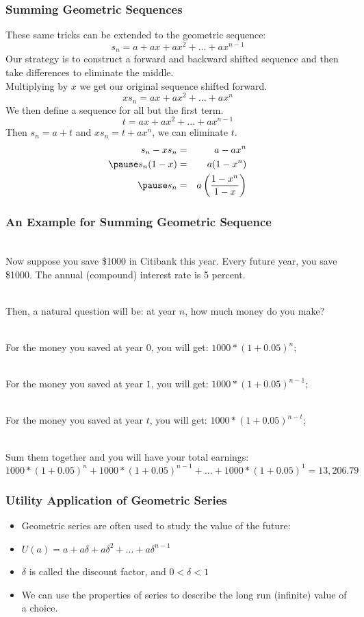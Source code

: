 \documentclass[handout]{beamer}
\numberwithin{equation}{section}
\begin{document}
\begin{frame}
\frametitle{Summing Geometric Sequences}
These same tricks can be extended to the geometric sequence:
$$s_n=a+ax+ax^2+...+ax^{n-1}$$ \pause
Our strategy is to construct a forward and backward shifted sequence and then take differences to eliminate the middle.\pause
\ \\Multiplying by $x$ we get our original sequence shifted forward.
$$xs_n=ax+ax^2+...+ax^n$$ \pause
We then define a sequence for all but the first term.
$$t=ax+ax^2+...+ax^{n-1}$$ \pause 
Then $s_n=a+t$ and $xs_n=t+ax^n$, we can eliminate $t$.  
\begin{eqnarray}
s_n-xs_n&=&a-ax^n \nonumber\\ \pause
s_n(1-x)&=&a(1-x^n) \nonumber\\ \pause
s_n &=& a\left({\frac{1-x^n}{1-x}}\right)  \nonumber
\end{eqnarray}

\end{frame}



\begin{frame}
\frametitle{An Example for Summing Geometric Sequence}

\ \\Now suppose you save \$1000 in Citibank this year. Every future year, you save \$1000. The annual (compound) interest rate is 5 percent. \pause

\ \\Then, a natural question will be: at year $n$, how much money do you make? \pause

\ \\For the money you saved at year $0$, you will get: $1000 * (1 + 0.05)^{n}$; \pause

\ \\For the money you saved at year $1$, you will get: $1000 * (1 + 0.05)^{n-1}$; \pause

\ \\For the money you saved at year $t$, you will get: $1000 * (1 + 0.05)^{n-t}$; \pause

\ \\Sum them together and you will have your total earnings: 
$$1000 * (1 + 0.05)^{n} + 1000 * (1 + 0.05)^{n-1} + ... + 1000 * (1 + 0.05)^{1}=13,206.79$$

\end{frame}

\begin{frame}
\frametitle{Utility Application of Geometric Series}
\begin{itemize}
\item Geometric series are often used to study the value of the future:
\item $U(a)=a+a\delta+a\delta^2+...+a\delta^{n-1}$ \pause
\item $\delta$ is called the discount factor, and  $0<\delta<1$ \pause
\item We can use the properties of series to describe the long run (infinite) value of a choice.
\end{itemize}

\end{frame}
\end{document}
